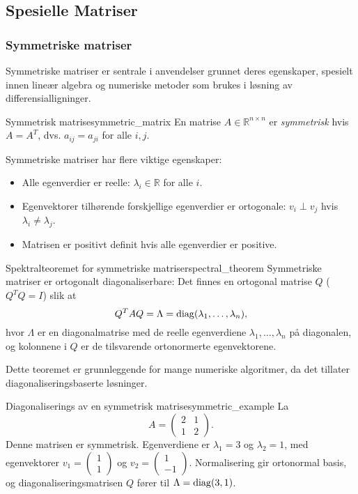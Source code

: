 \documentclass[../main.tex]{subfiles}
\begin{document}
\subsection{Spesielle Matriser}
\subsubsection{Symmetriske matriser}
Symmetriske matriser er sentrale i anvendelser grunnet deres egenskaper, spesielt innen lineær algebra og numeriske metoder som brukes i løsning av differensialligninger.

\begin{definition}{Symmetrisk matrise}{symmetric_matrix}
	En matrise $A \in \mathbb{R}^{n \times n}$ er \emph{symmetrisk} hvis $A = A^T$, dvs. $a_{ij} = a_{ji}$ for alle $i,j$.
\end{definition}

Symmetriske matriser har flere viktige egenskaper:
\begin{itemize}
	\item Alle egenverdier er reelle: $\lambda_i \in \mathbb{R}$ for alle $i$.
	\item Egenvektorer tilhørende forskjellige egenverdier er ortogonale: $v_i \perp v_j$ hvis $\lambda_i \neq \lambda_j$.
	\item Matrisen er positivt definit hvis alle egenverdier er positive.
\end{itemize}

\begin{theorem}{Spektralteoremet for symmetriske matriser}{spectral_theorem}
	Symmetriske matriser er ortogonalt diagonaliserbare: Det finnes en ortogonal matrise $Q$ ($Q^T Q = I$) slik at
	\[
		Q^T A Q = \Lambda = \operatorname{diag}(\lambda_1, \dots, \lambda_n),
	\]
	hvor $\Lambda$ er en diagonalmatrise med de reelle egenverdiene $\lambda_1, \dots, \lambda_n$ på diagonalen, og kolonnene i $Q$ er de tilsvarende ortonormerte egenvektorene.
\end{theorem}

Dette teoremet er grunnleggende for mange numeriske algoritmer, da det tillater diagonaliseringsbaserte løsninger.

\begin{example}{Diagonaliserings av en symmetrisk matrise}{symmetric_example}
	La
	\[
		A = \begin{pmatrix} 2 & 1 \\ 1 & 2 \end{pmatrix}.
	\]
	Denne matrisen er symmetrisk. Egenverdiene er $\lambda_1 = 3$ og $\lambda_2 = 1$, med egenvektorer $v_1 = \begin{pmatrix} 1 \\ 1 \end{pmatrix}$ og $v_2 = \begin{pmatrix} 1 \\ -1 \end{pmatrix}$. Normalisering gir ortonormal basis, og diagonaliseringsmatrisen $Q$ fører til $\Lambda = \operatorname{diag}(3, 1)$.
\end{example}
\end{document}
